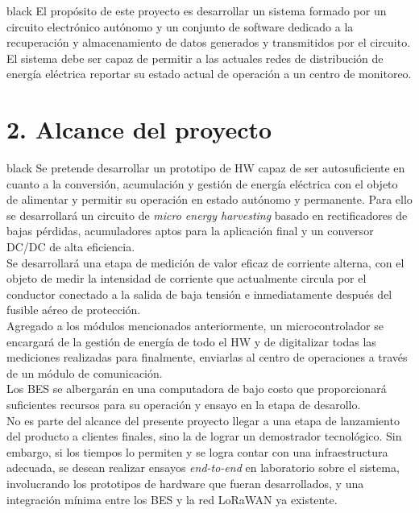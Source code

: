 \documentclass[11pt]{charter}
\begin{document}
\begin{consigna}{black}
El propósito de este proyecto es desarrollar un sistema formado por un circuito electrónico autónomo y un conjunto de software dedicado a la recuperación y almacenamiento de datos generados y transmitidos por el circuito.\\

El sistema debe ser capaz de permitir a las actuales redes de distribución de energía eléctrica reportar su estado actual de operación a un centro de monitoreo.
\end{consigna}

\section{2. Alcance del proyecto}
\label{sec:alcance}

\begin{consigna}{black}
Se pretende desarrollar un prototipo de HW capaz de ser autosuficiente en cuanto a la conversión, acumulación y gestión de energía eléctrica con el objeto de alimentar y permitir su operación en estado autónomo y permanente. Para ello se desarrollará un circuito de \textit{micro energy harvesting} basado en rectificadores de bajas pérdidas, acumuladores aptos para la aplicación final y un conversor DC/DC de alta eficiencia.\\

Se desarrollará una etapa de medición de valor eficaz de corriente alterna, con el objeto de medir la intensidad de corriente que actualmente circula por el conductor conectado a la salida de baja tensión e inmediatamente después del fusible aéreo de protección.\\

Agregado a los módulos mencionados anteriormente, un microcontrolador se encargará de la gestión de energía de todo el HW y de digitalizar todas las mediciones realizadas para finalmente, enviarlas al centro de operaciones a través de un módulo de comunicación.\\

Los BES se albergarán en una computadora de bajo costo que proporcionará suficientes recursos para su operación y ensayo en la etapa de desarollo.\\

No es parte del alcance del presente proyecto llegar a una etapa de lanzamiento del producto a clientes finales, sino la de lograr un demostrador tecnológico. Sin embargo, si los tiempos lo permiten y se logra contar con una infraestructura adecuada, se desean realizar ensayos \textit{end-to-end} en laboratorio sobre el sistema, involucrando los prototipos de hardware que fueran desarrollados, y una integración mínima entre los BES y la red LoRaWAN ya existente.\\
\end{consigna}
\end{document}
